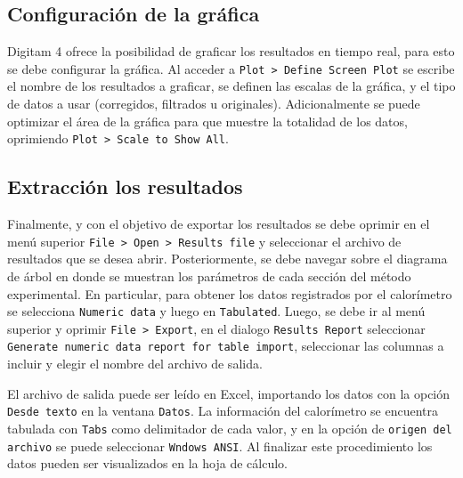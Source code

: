 	\subsection{Configuración de la gráfica}
	Digitam 4 ofrece la posibilidad de graficar los resultados en tiempo real, para esto se debe configurar la gr\'afica. Al acceder a \texttt{Plot > Define Screen Plot} se escribe el nombre de los resultados a graficar, se definen las escalas de la gr\'afica, y el tipo de datos a usar (corregidos, filtrados u originales). Adicionalmente se puede optimizar el \'area de la gr\'afica para que muestre la totalidad de los datos, oprimiendo \texttt{Plot > Scale to Show All}.
	
	\subsection{Extracci\'on los resultados}
	Finalmente, y con el objetivo de exportar los resultados se debe oprimir en el men\'u superior \texttt{File > Open > Results file} y seleccionar el archivo de resultados que se desea abrir. Posteriormente, se debe navegar sobre el diagrama de \'arbol en donde se muestran los par\'ametros de cada secci\'on del m\'etodo experimental. En particular, para obtener los datos registrados por el calor\'imetro se selecciona \texttt{Numeric data} y luego en \texttt{Tabulated}. Luego, se debe ir al men\'u superior y oprimir \texttt{File > Export}, en el dialogo \texttt{Results Report} seleccionar \texttt{Generate numeric data report for table import}, seleccionar las columnas a incluir y elegir el nombre del archivo de salida.
	
	El archivo de salida puede ser le\'ido en Excel, importando los datos con la opci\'on \texttt{Desde texto} en la ventana \texttt{Datos}. La informaci\'on del calor\'imetro se encuentra tabulada con \texttt{Tabs} como delimitador de cada valor, y en la opci\'on de \texttt{origen del archivo} se puede seleccionar \texttt{Wndows ANSI}. Al finalizar este procedimiento los datos pueden ser visualizados en la hoja de c\'alculo.
	
